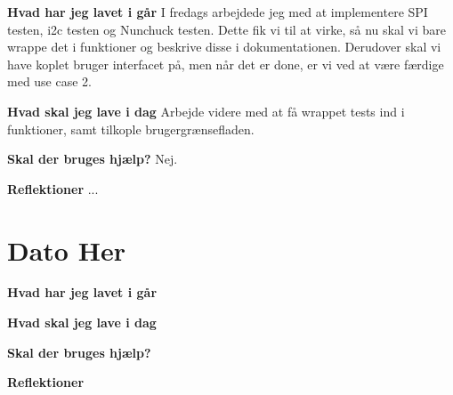 \documentclass{article}
\begin{document}
	\textbf{Hvad har jeg lavet i går}
	I fredags arbejdede jeg med at implementere SPI testen, i2c testen og Nunchuck testen. Dette fik vi til at virke, så nu skal vi bare wrappe det i funktioner og beskrive disse i dokumentationen. Derudover skal vi have koplet bruger interfacet på, men når det er done, er vi ved at være færdige med use case 2.
	
	\textbf{Hvad skal jeg lave i dag}
	Arbejde videre med at få wrappet tests ind i funktioner, samt tilkople brugergrænsefladen.
	
	\textbf{Skal der bruges hjælp?}
	Nej. 
	
	\textbf{Reflektioner}
	...
	\section{Dato Her}
	
	\textbf{Hvad har jeg lavet i går}
	
	\textbf{Hvad skal jeg lave i dag}
	
	\textbf{Skal der bruges hjælp?}
	
	\textbf{Reflektioner}
	
	
\end{document}
